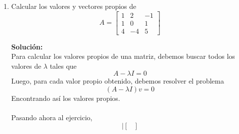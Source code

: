 \documentclass[12pt]{article}
\newenvironment{solucion}
{\begin{mdframed}[backgroundcolor=black!10]
		{\bf Solución:}\\
	}
	{
	\end{mdframed}
}
\newenvironment{preguntas}
{\begin{enumerate}\itemsep12pt
	}
	{
	\end{enumerate}
}
\newcommand{\ra}{\rightarrow}
\begin{document}
\begin{preguntas}
\begin{solucion}
\begin{enumerate}[a)]
			Sea $B = \{v_1, v_2\}$ la base dada, busquemos una base $B_W$ de $W$\\
			\\
			Sea $v \in W$,
			$$v = x_1v_1 + x_2v_2 \ra x = \begin{pmatrix} x_1 \\ x_2 \end{pmatrix} = [v]_B$$
			Además,
			$$\begin{array}{cclcl}
			[v]_C & = & 2[v]_B & = & 2x \\
			{[}v]_C & = & P[v]_B & = & Px
			\end{array} \Longrightarrow
			2x = Px$$
			Luego,
			$$2x = Px$$
			$$Px - 2x = 0$$
			$$(P - 2I)x = 0$$
			$$\left(\begin{bmatrix}4 &-1 \\ 6 & -1\end{bmatrix} - \begin{bmatrix}2 &0 \\ 0 & 2\end{bmatrix}\right)x = 0$$
			$$\begin{bmatrix}2 &-1 \\ 6 & -3\end{bmatrix}x = 0$$
			Resolviendo el sistema,
			$$\begin{bmatrix}2 &-1 \\ 6 & -3\end{bmatrix} \sim 
			\begin{bmatrix}2 &-1 \\ 0 & 0\end{bmatrix} \ra x_2 = 2x_1$$
			Luego,
			$$v = x_1v_1 + 2x_1v_2 = x_1(v_1 + 2v_2)$$
			Finalmente,
			$$B_W = \{v_1 + 2v_2\}$$
\end{enumerate}
\end{solucion}
\item Calcular los valores y vectores propios de
	$$ A = \begin{bmatrix} 1 & 2 & -1\\ 1 & 0 & 1\\ 4 & -4 & 5\end{bmatrix}$$
\begin{solucion}
Para calcular los valores propios de una matriz, debemos buscar todos los valores de $\lambda$ tales que
		$$A-\lambda I = 0$$
		Luego, para cada valor propio obtenido, debemos resolver el problema
		$$(A-\lambda I)v = 0$$
		Encontrando así los valores propios.\\
		\\
		Pasando ahora al ejercicio,
		$$\left|\begin{bmatrix}

\end{bmatrix}$$
\end{solucion}
\end{preguntas}
\end{document}
